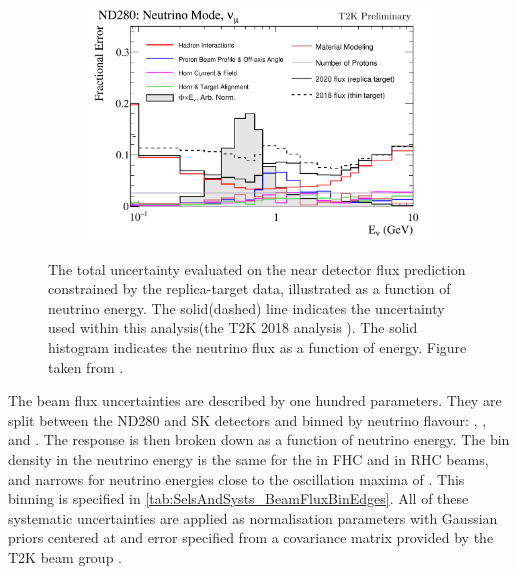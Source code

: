 \begin{figure}[h]
  \begin{subfigure}[t]{\textwidth}
    \includegraphics[width=\textwidth, trim={0mm 0mm 0mm 0mm}, clip,page=1]{Figures/Selections/flux_uncertainty_covariance_plots_addcorrnd_compwv3_flux_error_t2k_nd5_fhc_numu.pdf}
  \end{subfigure}
  \caption{The total uncertainty evaluated on the near detector \quickmath{\nu_{\mu}} flux prediction constrained by the replica-target data, illustrated as a function of neutrino energy. The solid(dashed) line indicates the uncertainty used within this analysis(the T2K 2018 analysis \cite{t2k_neutrino2018}). The solid histogram indicates the neutrino flux as a function of energy. Figure taken from \cite{t2k_tn_354}.}
  \label{fig:SelsAndSysts_BeamFluxSysts}
\end{figure}

The beam flux uncertainties are described by one hundred parameters. They are split between the ND280 and SK detectors and binned by neutrino flavour: \quickmath{\nu_{\mu}}, \quickmath{\bar{\nu}_{\mu}},  and . The response is then broken down as a function of neutrino energy. The bin density in the neutrino energy is the same for the \quickmath{\nu_{\mu}} in FHC and \quickmath{\bar{\nu}_{\mu}} in RHC beams, and narrows for neutrino energies close to the oscillation maxima of . This binning is specified in \autoref{tab:SelsAndSysts_BeamFluxBinEdges}. All of these systematic uncertainties are applied as normalisation parameters with Gaussian priors centered at  and error specified from a covariance matrix provided by the T2K beam group \cite{t2k_tn_354}.

